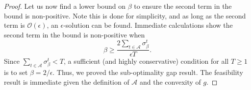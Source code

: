 \documentclass{article} %
\def\A{{\mathcal A}}
\begin{document}
\begin{proof}
Let us now find a lower bound on $\beta$ to ensure the second term in the bound is non-positive. Note this is done for simplicity, and as long as the second term is $\mathcal{O}(\epsilon)$, an $\epsilon$-solution can be found. Immediate calculations show  the second term in the bound is non-positive when
\begin{equation*}
    \beta \geq \frac{2\sum_{t\in \A} \sigma_\beta^t}{\epsilon T}.
\end{equation*}
Since $\sum_{t\in \A} \sigma_\beta^t <T$, a sufficient (and highly conservative) condition for all $T\geq 1$ is to set $\beta = 2/\epsilon$. 
Thus, we proved the sub-optimality gap result. The feasibility result is immediate given the definition of $\A$ and the convexity of $g$.
\end{proof}
\end{document}
